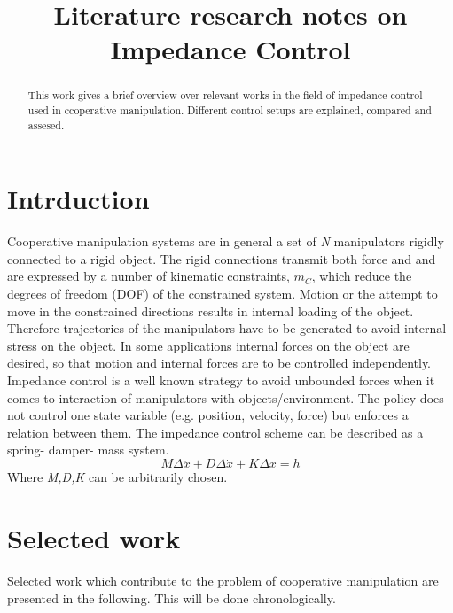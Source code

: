 \documentclass[conference]{IEEEtran}
\begin{document}
%
\title{Literature research notes on Impedance Control}


\author{

}

\maketitle

\begin{abstract}
This work gives a brief overview over relevant works in the field of impedance control used in ccoperative manipulation. Different control setups are explained, compared and assesed.
\end{abstract}

\section{Intrduction}
Cooperative manipulation systems are in general a set of \textit{N} manipulators rigidly connected to a rigid object. The rigid connections transmit both force and and are expressed by a number of kinematic constraints, \textit{$ m_{C} $}, which reduce the degrees of freedom (DOF) of the constrained system. Motion or the attempt to move in the constrained directions results in internal loading of the object. Therefore trajectories of the manipulators have to be generated to avoid internal stress on the object. In some applications internal forces on the object are desired, so that motion and internal forces are to be controlled independently.
Impedance control is a well known strategy to avoid unbounded forces when it comes to interaction of manipulators with objects/environment. The policy does not control one state variable (e.g. position, velocity, force) but enforces a relation between them. The impedance control scheme can be described as a spring- damper- mass system.
\begin{equation}
M\Delta\ddot{x} + D\Delta\dot{x} + K\Delta x = h
\end{equation}
Where \textit{M,D,K} can be arbitrarily chosen.


\section{Selected work}
Selected work which contribute to the problem of cooperative manipulation are presented in the following. This will be done chronologically.
\end{document}
